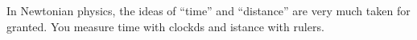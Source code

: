 \documentclass{report}
\begin{document}
In Newtonian physics, the ideas of ``time'' and ``distance'' are very much taken for granted. You measure time with clockds and istance with rulers. 
\end{document}
